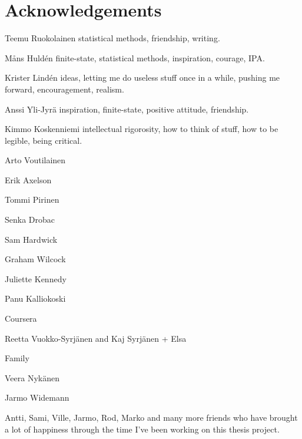\chapter*{Acknowledgements}

Teemu Ruokolainen statistical methods, friendship, writing.

Måns Huld\'{e}n finite-state, statistical methods, inspiration,
courage, IPA.

Krister Lind\'{e}n ideas, letting me do useless stuff once in a while,
pushing me forward, encouragement, realism.

Anssi Yli-Jyrä inspiration, finite-state, positive attitude, friendship.

Kimmo Koskenniemi intellectual rigorosity, how to think of stuff, how
to be legible, being critical.

Arto Voutilainen

Erik Axelson

Tommi Pirinen

Senka Drobac

Sam Hardwick

Graham Wilcock 

Juliette Kennedy

Panu Kalliokoski

Coursera

Reetta Vuokko-Syrjänen and Kaj Syrjänen + Elsa

Family

Veera Nykänen

Jarmo Widemann

Antti, Sami, Ville, Jarmo, Rod, Marko and many more friends who have
brought a lot of happiness through the time I've been working on this
thesis project.
